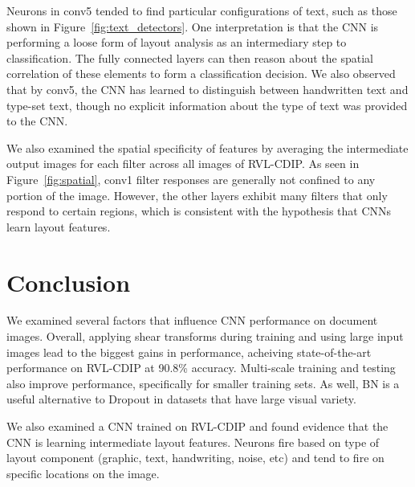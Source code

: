 \documentclass[10pt, conference, compsocconf]{IEEEtran}
\begin{document}
Neurons in conv5 tended to find particular configurations of text, such as those shown in Figure~\ref{fig:text_detectors}.
One interpretation is that the CNN is performing a loose form of layout analysis as an intermediary step to classification.
The fully connected layers can then reason about the spatial correlation of these elements to form a classification decision.
We also observed that by conv5, the CNN has learned to distinguish between handwritten text and type-set text, though no explicit information about the type of text was provided to the CNN.

We also examined the spatial specificity of features by averaging the intermediate output images for each filter across all images of RVL-CDIP.
As seen in Figure~\ref{fig:spatial}, conv1 filter responses are generally not confined to any portion of the image.
However, the other layers exhibit many filters that only respond to certain regions, which is consistent with the hypothesis that CNNs learn layout features.

\section{Conclusion}

We examined several factors that influence CNN performance on document images.
Overall, applying shear transforms during training and using large input images lead to the biggest gains in performance, acheiving state-of-the-art performance on RVL-CDIP at 90.8\% accuracy.
Multi-scale training and testing also improve performance, specifically for smaller training sets.
As well, BN is a useful alternative to Dropout in datasets that have large visual variety.

We also examined a CNN trained on RVL-CDIP and found evidence that the CNN is learning intermediate layout features.
Neurons fire based on type of layout component (graphic, text, handwriting, noise, etc) and tend to fire on specific locations on the image.

{\tiny
\newcommand{\BIBdecl}{\setlength{\itemsep}{0.25 em}}



}
	
\end{document}

